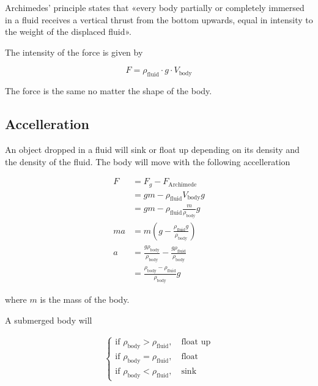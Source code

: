 \documentclass{article}
\begin{document}
Archimedes' principle states that
«every body partially or completely immersed in a fluid receives a
vertical thrust from the bottom upwards,
equal in intensity to the weight of the displaced fluid».

The intensity of the force is given by

\[
    F = \rho_\text{fluid} \cdot g \cdot V_\text{body}
\]

The force is the same no matter the shape of the body.

\subsection{Accelleration}

An object dropped in a fluid will sink or float up
depending on its density and the density of the fluid.
The body will move with the following accelleration

\begin{align*}
    F &= F_g - F_\text{Archimede} \\
    &= gm - \rho_\text{fluid}V_\text{body}g \\
    &= gm - \rho_\text{fluid}\frac{m}{\rho_\text{body}}g \\
    ma &= m \left( g- \frac{\rho_\text{fluid}g}{\rho_\text{body}} \right) \\
    a &= \frac{g\rho_\text{body}}{\rho_\text{body}} - \frac{g\rho_\text{fluid}}{\rho_\text{body}} \\
    &= \frac{\rho_\text{body} - \rho_\text{fluid}}{\rho_\text{body}}g
\end{align*}

where \(m\) is the mass of the body.

A submerged body will

\begin{align*}
	\begin{cases}
        \text{if } \rho_\text{body} > \rho_\text{fluid},\quad \text{float up} \\
        \text{if } \rho_\text{body} = \rho_\text{fluid},\quad \text{float} \\
        \text{if } \rho_\text{body} < \rho_\text{fluid},\quad \text{sink}
	\end{cases}
\end{align*}

\pagebreak
\end{document}
